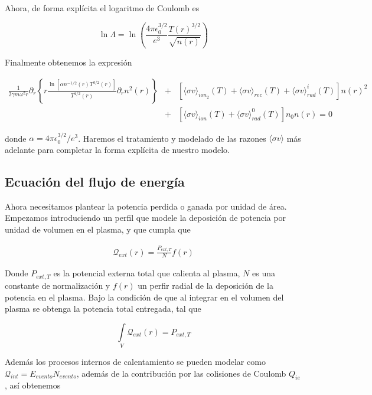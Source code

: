 Ahora, de forma expl\'icita el logaritmo de Coulomb \cite{hazeltine2018} es

\begin{equation*}
  \ln{\Lambda} = \ln\left(\frac{4\pi\epsilon_0^{3/2}}{e^3}\frac{T(r)^{3/2}}{\sqrt{n(r)}}\right)
\end{equation*}

Finalmente obtenemos la expresi\'on

\begin{eqnarray}
  \frac{1}{2\gamma m\omega^2 r}\partial_r\left\{r\frac{\ln\left[\alpha n^{-1/2}(r)T^{3/2}(r)\right]}{T^{1/2}(r)}\partial_r n^2(r)\right\} &+& [\langle\sigma v\rangle_{ion_2}(T) + \langle\sigma v\rangle_{rec}(T) + \langle\sigma v\rangle_{rad}^i(T)]n(r)^2 \nonumber\\&+& [\langle\sigma v\rangle_{ion}(T)+ \langle\sigma v\rangle_{rad}^0(T)]n_0n(r) = 0 \label{eq:particleEq}
\end{eqnarray}

donde $\alpha = 4\pi\epsilon_0^{3/2}/e^3$. Haremos el tratamiento y modelado de las razones $\langle \sigma v\rangle$ m\'as adelante para completar la forma expl\'icita de nuestro modelo.

\subsection{Ecuaci\'on del flujo de energ\'ia}

Ahora necesitamos plantear la potencia perdida o ganada por unidad de \'area. Empezamos introduciendo un perfil que modele la deposici\'on de potencia por unidad de volumen en el plasma, y que cumpla que 

\begin{eqnarray*}
  \mathcal{Q}_{ext}(r) = \frac{P_{ext,T}}{N}f(r)
\end{eqnarray*}

Donde $P_{ext,T}$ es la potencial externa total que calienta al plasma, $N$ es una constante de normalizaci\'on y $f(r)$ un perfir radial de la deposici\'on de la potencia en el plasma. Bajo la condici\'on de que al integrar en el volumen del plasma se obtenga la potencia total entregada, tal que 
 
\begin{equation*}
  \int\limits_V \mathcal{Q}_{ext}(r) = P_{ext,T}
\end{equation*}

Además los procesos internos de calentamiento se pueden modelar como $\mathcal{Q}_{int} = E_{evento}N_{evento}$, además de la contribuci\'on por las colisiones de Coulomb $Q_{ie}$, as\'i obtenemos

